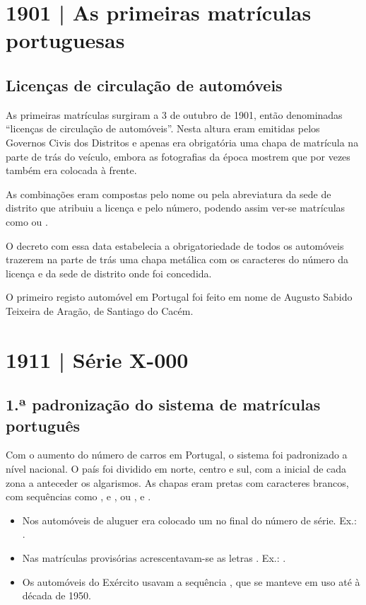 \section{1901 | As primeiras matrículas portuguesas}
\subsection*{Licenças de circulação de automóveis}

As primeiras matrículas surgiram a 3 de outubro de 1901, então denominadas
“licenças de circulação de automóveis”. Nesta altura eram emitidas pelos
Governos Civis dos Distritos e apenas era obrigatória uma chapa de matrícula na
parte de trás do veículo, embora as fotografias da época mostrem que por vezes
também era colocada à frente.

As combinações eram compostas pelo nome ou pela abreviatura da sede de distrito
que atribuiu a licença e pelo número, podendo assim ver-se matrículas como
 ou .

O decreto com essa data estabelecia a obrigatoriedade de todos os automóveis
trazerem na parte de trás uma chapa metálica com os caracteres do número da
licença e da sede de distrito onde foi concedida.

O primeiro registo automóvel em Portugal foi feito em nome de Augusto Sabido
Teixeira de Aragão, de Santiago do Cacém.

\section{1911 | Série X-000}
\subsection*{1.ª padronização do sistema de matrículas português}

Com o aumento do número de carros em Portugal, o sistema foi padronizado a
nível nacional. O país foi dividido em norte, centro e sul, com a inicial de
cada zona a anteceder os algarismos. As chapas eram pretas com caracteres
brancos, com sequências como ,  e , ou
,  e .


\begin{itemize}
  \item Nos automóveis de aluguer era colocado um  no final do número de
        série. Ex.: .
  \item Nas matrículas provisórias acrescentavam-se as letras .
        Ex.: .
  \item Os automóveis do Exército usavam a sequência , que se
        manteve em uso até à década de 1950.
\end{itemize}

